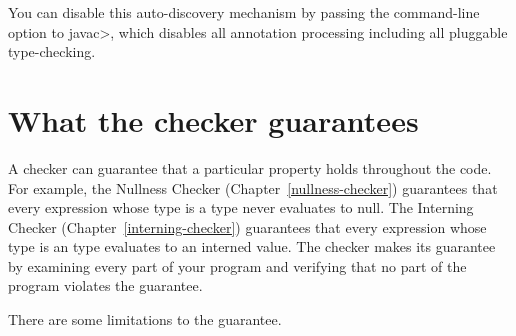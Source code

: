 You can disable this auto-discovery mechanism by passing the
 command-line option to \<javac>, which disables all
annotation processing including all pluggable type-checking.




\section{What the checker guarantees\label{checker-guarantees}}

A checker can guarantee that a particular property holds throughout the
code.  For example, the Nullness Checker (Chapter~\ref{nullness-checker})
guarantees that every expression whose type is a  type never
evaluates to null.  The Interning Checker (Chapter~\ref{interning-checker})
guarantees that every expression whose type is an  type
evaluates to an interned value.  The checker makes its guarantee by
examining every part of your program and verifying that no part of the
program violates the guarantee.

There are some limitations to the guarantee.


